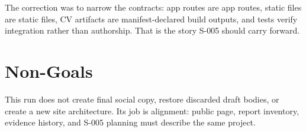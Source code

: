 \documentclass[a4paper,11pt,openany]{report}
\begin{document}
The correction was to narrow the contracts: app routes are app routes, static
files are static files, CV artifacts are manifest-declared build outputs, and
tests verify integration rather than authorship. That is the story S-005 should
carry forward.

\chapter{Non-Goals}

This run does not create final social copy, restore discarded draft bodies, or
create a new site architecture. Its job is alignment: public page, report
inventory, evidence history, and S-005 planning must describe the same project.
\end{document}
